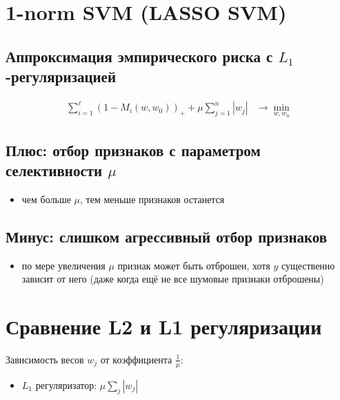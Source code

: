 \setcounter{secnumdepth}{0}

\section{1-norm SVM (LASSO SVM)}
\subsection*{Аппроксимация эмпирического риска с \(L_1\)-регуляризацией}
\begin{align*}
    \sum_{i=1}^{\ell} \left(1 - M_i(w, w_0)\right)_+ + \mu \sum_{j=1}^{n} |w_j| & \rightarrow \min_{w, w_0}
\end{align*}

\subsection*{Плюс: отбор признаков с параметром селективности \(\mu\)}
\begin{itemize}
    \item чем больше \(\mu\), тем меньше признаков останется
\end{itemize}

\subsection*{Минус: слишком агрессивный отбор признаков}
\begin{itemize}
    \item по мере увеличения \(\mu\) признак может быть отброшен, хотя $y$ существенно зависит от него (даже когда ещё не все шумовые признаки отброшены)
\end{itemize}

\vspace{10pt}

\section{Сравнение L2 и L1 регуляризации}

Зависимость весов \(w_j\) от коэффициента \(\frac{1}{\mu}\):

\begin{itemize}
    \item \(L_1\) регуляризатор: \(\mu \sum_{j} |w_j|\)
\end{itemize}

